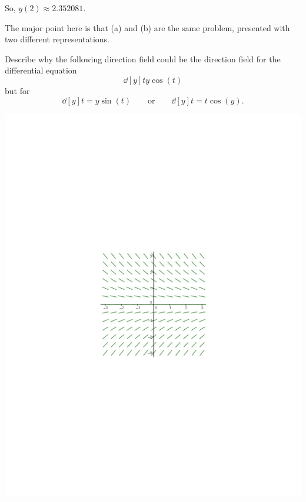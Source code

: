 \documentclass[handout]{ximera}
\begin{document}
\begin{problem}
\begin{enumerate}
\begin{freeResponse}
	So, $y(2) \approx 2.352081$.
	\end{freeResponse}
	\end{enumerate}
	
\end{problem}

\begin{instructorNotes}
The major point here is that (a) and (b) are the same problem, presented with two different representations.
\end{instructorNotes}







\begin{problem}
Describe why the following direction field could be the direction field for the differential equation 
	\[
	\dd[y]{t} y \cos(t)
	\]
but  for 
	\[
	\dd[y]{t} = y \sin(t) 	\qquad	\text{or}	\qquad	\dd[y]{t} = t \cos(y).
	\]
	
	\begin{image}
	\includegraphics[trim= 300 280 250 280,scale=0.8]{Figure8-2-2.pdf}
	\end{image}
	\begin{freeResponse}
		

\end{freeResponse}
\end{problem}
\end{document}
